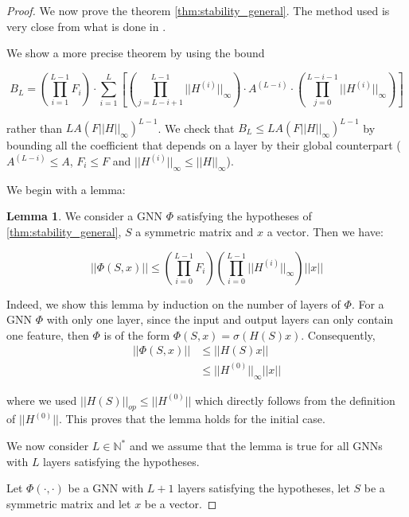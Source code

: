 \documentclass[11pt,a4paper]{article}
\newcommand{\op}[1]{|| #1 ||_{op}}
\newcommand{\ninf}[1]{|| #1 ||_\infty}
\newcommand{\Sum}[2]{\overset{#2}{\underset{#1}{\sum}}}
\newcommand{\Prod}[2]{\overset{#2}{\underset{#1}{\prod}}}
\theoremstyle{definition}
\newtheorem{lemma}[theorem]{Lemma}
\renewcommand{\leq}{\leqslant}
\begin{document}
\begin{proof}
            We now prove the theorem \ref{thm:stability_general}. The method used is very close from what is done in .
            
            We show a more precise theorem by using the bound 
            
            $$B_L = \left( \underset{i=1}{\overset{L-1}{\prod}} F_i \right)  \cdot \Sum{i=1}{L} \left[ (\underset{j=L-i+1}{\overset{L-1}{\prod}} \ninf{H ^{(i)}}) \cdot A^{(L-i)} \cdot (\underset{j=0}{\overset{L-i-1}{\prod}} \ninf{H ^{(i)}}) \right] $$
            
            rather than $L A (F \ninf{H} )^ {L-1}$. We check that $B_L \leq L A (F \ninf{H} )^ {L-1}$ by bounding all the coefficient that depends on a layer by their global counterpart ($A^{(L-i)} \leq A$, $F_i \leq F$ and $\ninf{H^{(i)}} \leq \ninf{H}$).
            
            We begin with a lemma:

            \begin{lemma}
                We consider a GNN $\Phi$ satisfying the hypotheses of \ref{thm:stability_general}, $S$ a symmetric matrix and $x$ a vector. Then we have:

                    $$ || \Phi(S,x) || \leq \left( \Prod{i=0}{L-1} F_i \right) \left( \Prod{i=0}{L-1} \ninf{H^{(i)}} \right) ||x|| $$
            \end{lemma}

            Indeed, we show this lemma by induction on the number of layers of $\Phi$. For a GNN $\Phi$ with only one layer, since the input and output layers can only contain one feature, then $\Phi$ is of the form $\Phi(S,x) = \sigma(H(S)x)$. Consequently, 
            \begin{align*}
                || \Phi (S,x) || &\leq || H(S) x || \\
                                 &\leq \ninf{H^{(0)}} ||x||
            \end{align*}

            where we used $\op{H(S)} \leq ||H^{(0)}||$ which directly follows from the definition of $||H^{(0)}||$. This proves that the lemma holds for the initial case.

            We now consider $L \in \mathbb{N}^*$ and we assume that the lemma is true for all GNNs with $L$ layers satisfying the hypotheses.

            Let $\Phi (\cdot,\cdot)$ be a GNN with $L+1$ layers satisfying the hypotheses, let $S$ be a symmetric matrix and let $x$ be a vector.


\end{proof}
\end{document}
